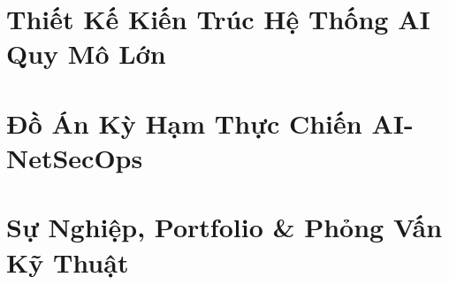 \documentclass[11pt,a4paper,oneside]{book}
\begin{document}
\part{Thiết Kế Kiến Trúc Hệ Thống AI Quy Mô Lớn}



\part{Đồ Án Kỳ Hạm Thực Chiến AI-NetSecOps}



\part{Sự Nghiệp, Portfolio \& Phỏng Vấn Kỹ Thuật}



\appendix





\end{document}
